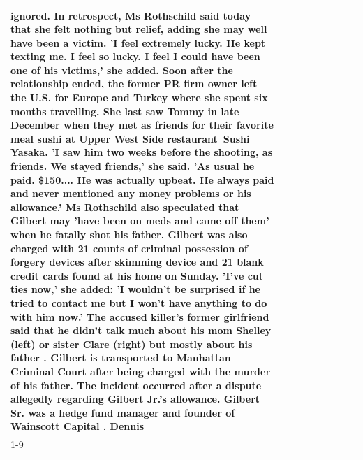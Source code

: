 \begin{table}[H]
\begin{tabular}{lllrlllll}
ignored. In retrospect, Ms Rothschild said today that she felt nothing but relief, adding she may well have been a victim. 'I feel extremely lucky. He kept texting me. I feel so lucky. I feel I could have been one of his victims,' she added. Soon after the relationship ended, the former PR firm owner left the U.S. for Europe and Turkey where she spent six months  travelling. She last saw Tommy in late December when they met as friends for their favorite meal sushi at Upper West Side restaurant Sushi Yasaka. 'I saw him two weeks before the shooting, as friends. We stayed friends,' she said. 'As usual he paid. \$150.... He was actually upbeat. He always paid and never mentioned any money problems or his allowance.' Ms Rothschild also speculated that Gilbert may 'have been on meds and came off them' when he fatally shot his father. Gilbert was also charged with 21 counts of criminal possession of forgery devices after skimming device and 21 blank credit cards found at his home on Sunday. 'I've cut ties now,' she added: 'I wouldn’t be surprised if he tried to contact me but I won’t have anything to do with him now.' The accused killer's former girlfriend said that he didn't talk much about his mom Shelley (left) or sister Clare (right) but mostly about his father . Gilbert is transported to Manhattan Criminal Court  after being charged with the murder of his father. The incident occurred after a dispute allegedly regarding Gilbert Jr.'s allowance. Gilbert Sr. was a hedge fund manager and founder of Wainscott Capital . Dennis \\
\cline{1-9} \cline{2-9}

\end{tabular}
\end{table}
